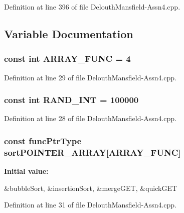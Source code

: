 Definition at line 396 of file DelouthMansfield-\/Assn4.cpp.



\subsection{Variable Documentation}
\hypertarget{_delouth_mansfield-_assn4_8cpp_a3b95dd60d5c45f7cc3733769f3d54868}{
\subsubsection[{ARRAY\_\-FUNC}]{\setlength{\rightskip}{0pt plus 5cm}const int {\bf ARRAY\_\-FUNC} = 4}}
\label{_delouth_mansfield-_assn4_8cpp_a3b95dd60d5c45f7cc3733769f3d54868}


Definition at line 29 of file DelouthMansfield-\/Assn4.cpp.

\hypertarget{_delouth_mansfield-_assn4_8cpp_a134c2ba56ae9ba89c77a5c0dba9f2124}{
\subsubsection[{RAND\_\-INT}]{\setlength{\rightskip}{0pt plus 5cm}const int {\bf RAND\_\-INT} = 100000}}
\label{_delouth_mansfield-_assn4_8cpp_a134c2ba56ae9ba89c77a5c0dba9f2124}


Definition at line 28 of file DelouthMansfield-\/Assn4.cpp.

\hypertarget{_delouth_mansfield-_assn4_8cpp_ae039780346621e190c7726c08c9a1a13}{
\subsubsection[{sortPOINTER\_\-ARRAY}]{\setlength{\rightskip}{0pt plus 5cm}const {\bf funcPtrType} {\bf sortPOINTER\_\-ARRAY}\mbox{[}{\bf ARRAY\_\-FUNC}\mbox{]}}}
\label{_delouth_mansfield-_assn4_8cpp_ae039780346621e190c7726c08c9a1a13}
{\bfseries Initial value:}
\begin{DoxyCode}
 {&bubbleSort,
                                          &insertionSort,
                                          &mergeGET,
                                                   &quickGET}
\end{DoxyCode}


Definition at line 31 of file DelouthMansfield-\/Assn4.cpp.


